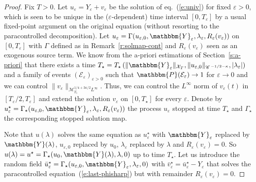 \begin{proof}
  Fix $T > 0$. Let $u_{\varepsilon} = Y_{\varepsilon} + v_{\varepsilon}$ be
  the solution of eq.~(\ref{e:univ}) for fixed $\varepsilon > 0$, which is
  seen to be unique in the ($\varepsilon$-dependent) time interval $[0,
  T_{\varepsilon}]$ by a usual fixed-point argument on the original equation
  (without resorting to the paracontrolled decomposition). Let
  $u_{\varepsilon} = \Gamma (u_{\varepsilon, 0}, \mathbbm{Y}_{\varepsilon},
  \lambda_{\varepsilon}, R_{\varepsilon} (v_{\varepsilon}))$ on $[0,
  T_{\varepsilon}]$ with $\Gamma$ defined as in Remark~\ref{r:solmap-cont} and
  $R_{\varepsilon} (v_{\varepsilon})$ seen as an exogenous source term. We
  know from the a-priori estimations of Section~\ref{s:a-priori} that there
  exists a time $T_{\star} = T_{\star} \left( \| \mathbbm{Y}_{\varepsilon}
  \|_{\mathcal{X}_T}, \| u_{\varepsilon, 0} \|_{\CC^{- 1 / 2 - \kappa}}, |
  \lambda_{\varepsilon} | \right)$ and a family of events
  $(\mathcal{E}_{\varepsilon})_{\varepsilon > 0}$ such that $\mathbbm{P}
  (\mathcal{E}_{\varepsilon}) \rightarrow 1$ for $\varepsilon \rightarrow 0$
  and we can control $\| v_{\varepsilon} \|_{\mathcal{M}^{1 / 4 + 3 \kappa /
  2}_{T_{\star}} L^{\infty}}$. Thus, we can control the $L^{\infty}$ norm of
  $v_{\varepsilon} (t)$ in $[T_{\varepsilon} / 2, T_{\varepsilon}]$ and extend
  the solution $v_{\varepsilon}$ on $[0, T_{\star}]$ for every $\varepsilon$.
  Denote by $u_{\varepsilon}^{\star} = \Gamma_{\star} (u_{\varepsilon, 0},
  \mathbbm{Y}_{\varepsilon}, \lambda_{\varepsilon}, R_{\varepsilon}
  (v_{\varepsilon}))$ the process $u_{\varepsilon}$ stopped at time
  $T_{\star}$ and $\Gamma_{\star}$ the corresponding stopped solution map. \
  
  Note that $u (\lambda)$ solves the same equation as
  $u_{\varepsilon}^{\star}$ with $\mathbbm{Y}_{\varepsilon}$ replaced by
  $\mathbbm{Y} (\lambda)$, $u_{\varepsilon, 0}$ replaced by $u_0$,
  $\lambda_{\varepsilon}$ replaced by $\lambda$ and $R_{\varepsilon}
  (v_{\varepsilon}) = 0$. So $u (\lambda) = u^{\star} = \Gamma_{\star} (u_0,
  \mathbbm{Y} (\lambda), \lambda, 0)$ up to time $T_{\star}$. Let us introduce
  the random field $\bar{u}_{\varepsilon}^{\star} = \Gamma_{\star}
  (u_{\varepsilon, 0}, \mathbbm{Y}_{\varepsilon}, \lambda_{\varepsilon}, 0)$
  with $\bar{v}^{\star}_{\varepsilon} = \bar{u}_{\varepsilon}^{\star} -
  Y_{\varepsilon}$ that solves the paracontrolled
  equation~(\ref{e:last-phisharp}) but with remainder $R_{\varepsilon}
  (v_{\varepsilon}) = 0$.
  

\end{proof}
